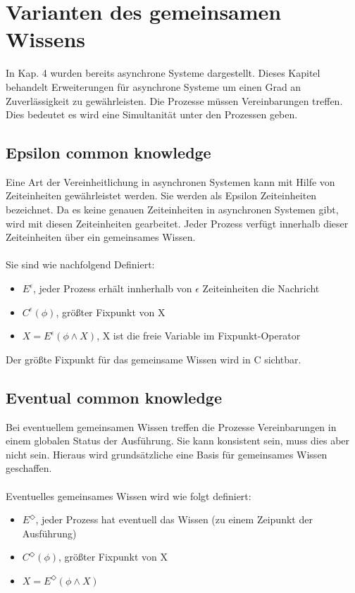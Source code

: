 \section{Varianten des gemeinsamen Wissens}
\label{GemeinsamesWissen}
In Kap. 4 wurden bereits asynchrone Systeme dargestellt. Dieses Kapitel behandelt Erweiterungen für asynchrone Systeme um einen Grad an Zuverlässigkeit zu gewährleisten. Die Prozesse müssen Vereinbarungen treffen. Dies bedeutet es wird eine Simultanität unter den Prozessen geben. 
\subsection{Epsilon common knowledge}
\label{epsilon_comm_know}
Eine Art der Vereinheitlichung in asynchronen Systemen kann mit Hilfe von Zeiteinheiten gewährleistet werden. Sie werden als Epsilon Zeiteinheiten bezeichnet. Da es keine genauen Zeiteinheiten in asynchronen Systemen gibt, wird mit diesen Zeiteinheiten gearbeitet. Jeder Prozess verfügt innerhalb dieser Zeiteinheiten über ein gemeinsames Wissen.\\\\ Sie sind wie nachfolgend Definiert:
\begin{itemize}
			\item $E^\epsilon$, jeder Prozess erhält innherhalb von $\epsilon$ Zeiteinheiten die Nachricht
			\item $C^\epsilon(\phi) $, größter Fixpunkt von X
			\item $X=E^\epsilon(\phi \wedge X) $, X ist die freie Variable im Fixpunkt-Operator 
		\end{itemize}
Der größte Fixpunkt für das gemeinsame Wissen wird in C sichtbar.
\subsection{Eventual common knowledge}
\label{eventual_comm_know}
Bei eventuellem gemeinsamen Wissen treffen die Prozesse Vereinbarungen in einem globalen Status der Ausführung. Sie kann konsistent sein, muss dies aber nicht sein. Hieraus wird grundsätzliche eine Basis für gemeinsames Wissen geschaffen. \\\\
Eventuelles gemeinsames Wissen wird wie folgt definiert:
\begin{itemize}
			\item $E^\Diamond$, jeder Prozess hat eventuell das Wissen (zu einem Zeipunkt der Ausführung)
			\item $C^\Diamond(\phi) $, größter Fixpunkt von X
			\item $X=E^\Diamond(\phi \wedge X) $

\end{itemize}

